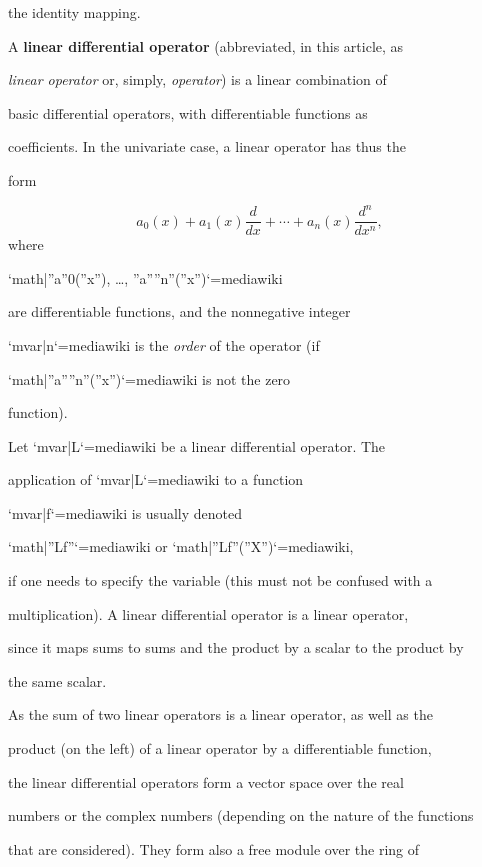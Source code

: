 the identity mapping.



A \textbf{linear differential operator} (abbreviated, in this article, as

\textit{linear operator} or, simply, \textit{operator}) is a linear combination of

basic differential operators, with differentiable functions as

coefficients. In the univariate case, a linear operator has thus the

form



$$a_0(x)+a_1(x)\frac{d}{dx} + \cdots +a_n(x)\frac{d^n}{dx^n},$$ where

`{{math|''a''0(''x''), …, ''a''''n''(''x'')}}`{=mediawiki}

are differentiable functions, and the nonnegative integer

`{{mvar|n}}`{=mediawiki} is the \textit{order} of the operator (if

`{{math|''a''''n''(''x'')}}`{=mediawiki} is not the zero

function).



Let `{{mvar|L}}`{=mediawiki} be a linear differential operator. The

application of `{{mvar|L}}`{=mediawiki} to a function

`{{mvar|f}}`{=mediawiki} is usually denoted

`{{math|''Lf''}}`{=mediawiki} or `{{math|''Lf''(''X'')}}`{=mediawiki},

if one needs to specify the variable (this must not be confused with a

multiplication). A linear differential operator is a linear operator,

since it maps sums to sums and the product by a scalar to the product by

the same scalar.



As the sum of two linear operators is a linear operator, as well as the

product (on the left) of a linear operator by a differentiable function,

the linear differential operators form a vector space over the real

numbers or the complex numbers (depending on the nature of the functions

that are considered). They form also a free module over the ring of

